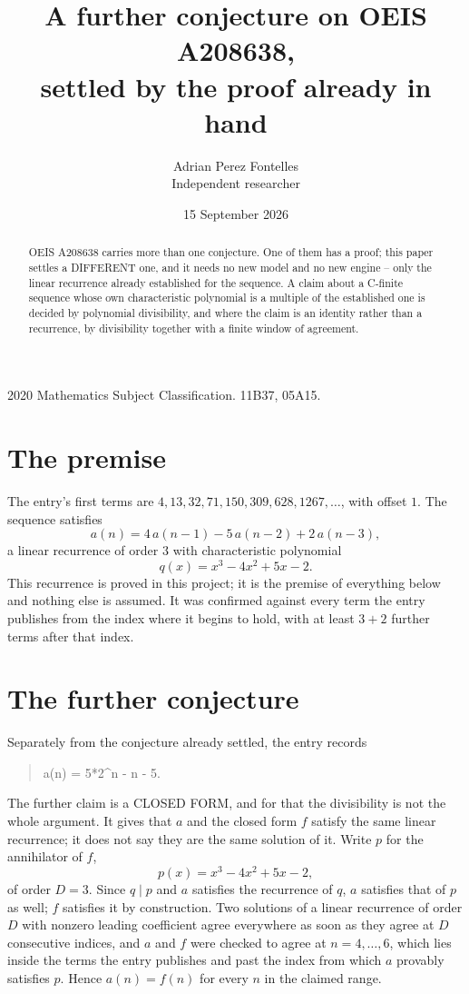\documentclass[11pt,a4paper]{article}
\title{A further conjecture on OEIS A208638,\\ \large settled by the proof already in hand}
\author{Adrian Perez Fontelles\\ \small Independent researcher}
\date{15 September 2026}
\theoremstyle{plain}
\theoremstyle{definition}
\begin{document}
\maketitle

\begin{abstract}
OEIS A208638 carries more than one conjecture. One of them has a proof; this paper settles a
DIFFERENT one, and it needs no new model and no new engine -- only the linear recurrence already
established for the sequence. A claim about a C-finite sequence whose own characteristic
polynomial is a multiple of the established one is decided by polynomial divisibility, and where
the claim is an identity rather than a recurrence, by divisibility together with a finite window
of agreement.
\end{abstract}

\noindent\small 2020 Mathematics Subject Classification. 11B37, 05A15.\normalsize

\section{The premise}

The entry's first terms are $4, 13, 32, 71, 150, 309, 628, 1267,\dots$, with offset $1$. The sequence satisfies
\[
  a(n)=4\,a(n-1) - 5\,a(n-2) + 2\,a(n-3) ,
\]
a linear recurrence of order $3$ with characteristic polynomial
\[
  q(x)=x^{3} - 4 x^{2} + 5 x - 2 .
\]
This recurrence is proved in this project; it is the premise of everything below and nothing else is assumed.
It was confirmed against every term the entry publishes from the index where it begins to hold,
with at least $3+2$ further terms after that index.

\section{The further conjecture}

Separately from the conjecture already settled, the entry records

\begin{quote}\raggedright a(n) = 5*2\^{}n - n - 5.\end{quote}

The further claim is a CLOSED FORM, and for that the divisibility is not the whole argument. It
gives that $a$ and the closed form $f$ satisfy the same linear recurrence; it does not say they
are the same solution of it. Write $p$ for the annihilator of $f$,
\[
  p(x)=x^{3} - 4 x^{2} + 5 x - 2 ,
\]
of order $D=3$. Since $q\mid p$ and $a$ satisfies the recurrence of $q$, $a$ satisfies that of
$p$ as well; $f$ satisfies it by construction. Two solutions of a linear recurrence of order $D$
with nonzero leading coefficient agree everywhere as soon as they agree at $D$ consecutive
indices, and $a$ and $f$ were checked to agree at $n=4,\dots,6$,
which lies inside the terms the entry publishes and past the index from which $a$ provably
satisfies $p$. Hence $a(n)=f(n)$ for every $n$ in the claimed range.
\end{document}
